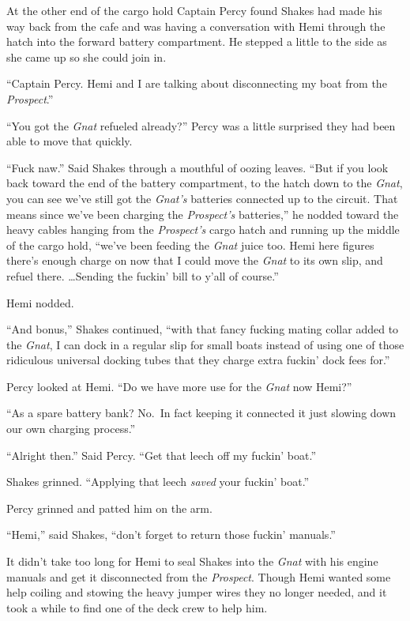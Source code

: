 \documentclass[]{scrbook}
\begin{document}
At the other end of the cargo hold Captain Percy found Shakes had made
his way back from the cafe and was having a conversation with Hemi
through the hatch into the forward battery compartment. He stepped a
little to the side as she came up so she could join in.

``Captain Percy. Hemi and I are talking about disconnecting my boat from
the \emph{Prospect}.''

``You got the \emph{Gnat} refueled already?'' Percy was a little
surprised they had been able to move that quickly.

``Fuck naw.'' Said Shakes through a mouthful of oozing leaves. ``But if
you look back toward the end of the battery compartment, to the hatch
down to the \emph{Gnat}, you can see we've still got the \emph{Gnat's}
batteries connected up to the circuit. That means since we've been
charging the \emph{Prospect's} batteries,'' he nodded toward the heavy
cables hanging from the \emph{Prospect's} cargo hatch and running up the
middle of the cargo hold, ``we've been feeding the \emph{Gnat} juice
too. Hemi here figures there's enough charge on now that I could move
the \emph{Gnat} to its own slip, and refuel there. \ldots{}Sending the
fuckin' bill to y'all of course.''

Hemi nodded.

``And bonus,'' Shakes continued, ``with that fancy fucking mating collar
added to the \emph{Gnat}, I can dock in a regular slip for small boats
instead of using one of those ridiculous universal docking tubes that
they charge extra fuckin' dock fees for.''

Percy looked at Hemi. ``Do we have more use for the \emph{Gnat} now
Hemi?''

``As a spare battery bank? No.~In fact keeping it connected it just
slowing down our own charging process.''

``Alright then.'' Said Percy. ``Get that leech off my fuckin' boat.''

Shakes grinned. ``Applying that leech \emph{saved} your fuckin' boat.''

Percy grinned and patted him on the arm.

``Hemi,'' said Shakes, ``don't forget to return those fuckin' manuals.''

It didn't take too long for Hemi to seal Shakes into the \emph{Gnat}
with his engine manuals and get it disconnected from the
\emph{Prospect}. Though Hemi wanted some help coiling and stowing the
heavy jumper wires they no longer needed, and it took a while to find
one of the deck crew to help him.
\end{document}
